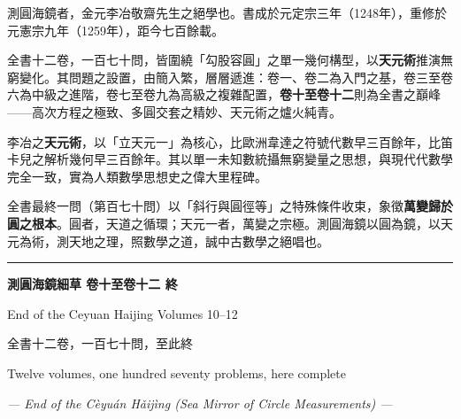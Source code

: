 \documentclass[11pt,a4paper]{article}
\newcommand{\longline}{\noindent\rule{\textwidth}{0.4pt}}
\begin{document}
\begin{framed}
測圓海鏡者，金元李冶敬齋先生之絕學也。書成於元定宗三年（1248年），重修於元憲宗九年（1259年），距今七百餘載。

全書十二卷，一百七十問，皆圍繞「勾股容圓」之單一幾何構型，以\textbf{天元術}推演無窮變化。其問題之設置，由簡入繁，層層遞進：卷一、卷二為入門之基，卷三至卷六為中級之進階，卷七至卷九為高級之複雜配置，\textbf{卷十至卷十二}則為全書之巔峰——高次方程之極致、多圓交套之精妙、天元術之爐火純青。

李冶之\textbf{天元術}，以「立天元一」為核心，比歐洲韋達之符號代數早三百餘年，比笛卡兒之解析幾何早三百餘年。其以單一未知數統攝無窮變量之思想，與現代代數學完全一致，實為人類數學思想史之偉大里程碑。

全書最終一問（第百七十問）以「斜行與圓徑等」之特殊條件收束，象徵\textbf{萬變歸於圓之根本}。圓者，天道之循環；天元一者，萬變之宗極。測圓海鏡以圓為鏡，以天元為術，測天地之理，照數學之道，誠中古數學之絕唱也。
\end{framed}

\vspace{1cm}
\begin{center}
\longline

\vspace{0.5cm}
{\Large\bfseries 測圓海鏡細草 卷十至卷十二 終}

\vspace{0.3cm}
{\normalsize End of the Ceyuan Haijing Volumes 10--12}

\vspace{0.5cm}
{\small\color{notecolor} 全書十二卷，一百七十問，至此終}

\vspace{0.3cm}
{\small\color{notecolor} Twelve volumes, one hundred seventy problems, here complete}
\end{center}

\vfill
\begin{center}
\textit{--- End of the C\`{e}yu\'{a}n H\v{a}ij\`{i}ng (Sea Mirror of Circle Measurements) ---}
\end{center}
\end{document}
